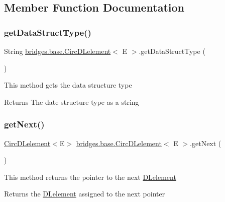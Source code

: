 \subsection{Member Function Documentation}
\mbox{\label{classbridges_1_1base_1_1_circ_d_lelement_ab4885ae7517f1dd04874270c1c3eaf44}} 
\subsubsection{\texorpdfstring{getDataStructType()}{getDataStructType()}}
{\footnotesize\ttfamily String \mbox{\hyperlink{classbridges_1_1base_1_1_circ_d_lelement}{bridges.\+base.\+Circ\+D\+Lelement}}$<$ E $>$.get\+Data\+Struct\+Type (\begin{DoxyParamCaption}{ }\end{DoxyParamCaption})}

This method gets the data structure type

\begin{DoxyReturn}{Returns}
The date structure type as a string 
\end{DoxyReturn}
\mbox{\label{classbridges_1_1base_1_1_circ_d_lelement_a9ace56dde1f4c23e9a8798c045100ee6}} 
\subsubsection{\texorpdfstring{getNext()}{getNext()}}
{\footnotesize\ttfamily \mbox{\hyperlink{classbridges_1_1base_1_1_circ_d_lelement}{Circ\+D\+Lelement}}$<$E$>$ \mbox{\hyperlink{classbridges_1_1base_1_1_circ_d_lelement}{bridges.\+base.\+Circ\+D\+Lelement}}$<$ E $>$.get\+Next (\begin{DoxyParamCaption}{ }\end{DoxyParamCaption})}

This method returns the pointer to the next \mbox{\hyperlink{classbridges_1_1base_1_1_d_lelement}{D\+Lelement}}

\begin{DoxyReturn}{Returns}
the \mbox{\hyperlink{classbridges_1_1base_1_1_d_lelement}{D\+Lelement}} assigned to the next pointer 
\end{DoxyReturn}
\mbox{\label{classbridges_1_1base_1_1_circ_d_lelement_aa2b83017a571694460f77dd31b4188ed}} 
